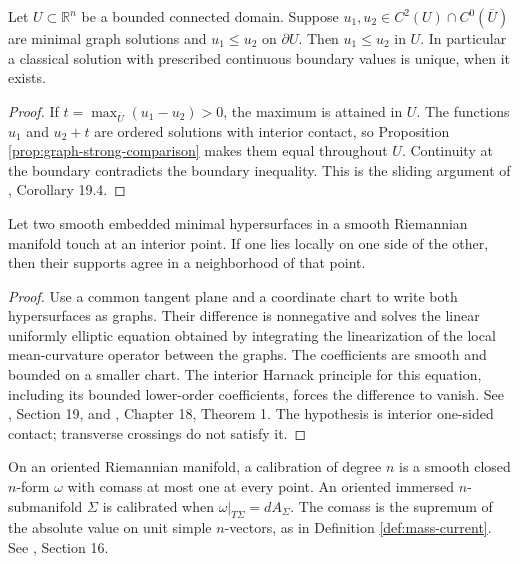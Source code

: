 \begin{corollary}\label{cor:graph-dirichlet-uniqueness}
Let $U\subset\mathbb R^n$ be a bounded connected domain. Suppose $u_1,u_2\in C^2(U)\cap C^0(\overline U)$ are minimal graph solutions and $u_1\leq u_2$ on $\partial U$. Then $u_1\leq u_2$ in $U$. In particular a classical solution with prescribed continuous boundary values is unique, when it exists.
\end{corollary}
\begin{proof}
If $t=\max_{\overline U}(u_1-u_2)>0$, the maximum is attained in $U$. The functions $u_1$ and $u_2+t$ are ordered solutions with interior contact, so Proposition \ref{prop:graph-strong-comparison} makes them equal throughout $U$. Continuity at the boundary contradicts the boundary inequality. This is the sliding argument of \cite{ChMin}, Corollary 19.4.
\end{proof}

\begin{corollary}\label{cor:minimal-tangency}
Let two smooth embedded minimal hypersurfaces in a smooth Riemannian manifold touch at an interior point. If one lies locally on one side of the other, then their supports agree in a neighborhood of that point.
\end{corollary}
\begin{proof}
Use a common tangent plane and a coordinate chart to write both hypersurfaces as graphs. Their difference is nonnegative and solves the linear uniformly elliptic equation obtained by integrating the linearization of the local mean-curvature operator between the graphs. The coefficients are smooth and bounded on a smaller chart. The interior Harnack principle for this equation, including its bounded lower-order coefficients, forces the difference to vanish. See \cite{ChMin}, Section 19, and \cite{SimonPDE}, Chapter 18, Theorem 1. The hypothesis is interior one-sided contact; transverse crossings do not satisfy it.
\end{proof}

\begin{definition}[Calibrations]\label{def:calibration}
On an oriented Riemannian manifold, a calibration of degree $n$ is a smooth closed $n$-form $\omega$ with comass at most one at every point. An oriented immersed $n$-submanifold $\Sigma$ is calibrated when $\omega|_{T\Sigma}=dA_\Sigma$. The comass is the supremum of the absolute value on unit simple $n$-vectors, as in Definition \ref{def:mass-current}. See \cite{ChMin}, Section 16.
\end{definition}


